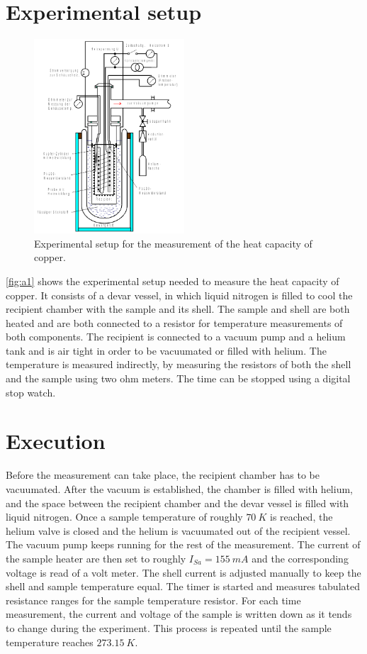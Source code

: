 \section{Experimental setup}
\label{sec:Aufbau}
\begin{figure}[H]
    \centering
    \includegraphics[width=0.5\textwidth]{aufbv47.pdf}
    \caption{Experimental setup for the measurement of the heat capacity of copper. \cite{V47}}
    \label{fig:a1}
\end{figure}
\noindent
\autoref{fig:a1} shows the experimental setup needed to measure the heat capacity of copper. It consists of a devar vessel, in which liquid nitrogen is filled to cool the recipient chamber with the sample and its shell. The sample and shell are both heated and are both connected to a resistor for temperature measurements of both components. The recipient is connected to a vacuum pump and a helium tank and is air tight in order to be vacuumated or filled with helium. The temperature is measured indirectly, by measuring the resistors of both the shell and the sample using two ohm meters. The time can be stopped using a digital stop watch.
\section{Execution}
\label{sec:Durchführung}
Before the measurement can take place, the recipient chamber has to be vacuumated. After the vacuum is established, the chamber is filled with helium, and the space between the recipient chamber and the devar vessel is filled with liquid nitrogen. Once a sample temperature of roughly $\SI{70}{K}$ is reached, the helium valve is closed and the helium is vacuumated out of the recipient vessel. The vacuum pump keeps running for the rest of the measurement. The current of the sample heater are then set to roughly $I_{Sa} = \SI{155}{mA}$ and the corresponding voltage is read of a volt meter. The shell current is adjusted manually to keep the shell and sample temperature equal. The timer is started and measures tabulated resistance ranges for the sample temperature resistor. For each time measurement, the current and voltage of the sample is written down as it tends to change during the experiment. This process is repeated until the sample temperature reaches $\SI{273.15}{K}$. 

\newpage